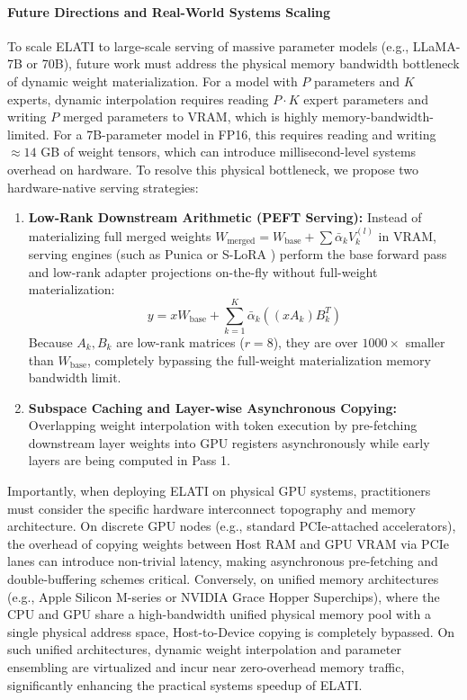 \paragraph{Future Directions and Real-World Systems Scaling}
To scale ELATI to large-scale serving of massive parameter models (e.g., LLaMA-7B or 70B), future work must address the physical memory bandwidth bottleneck of dynamic weight materialization.
For a model with $P$ parameters and $K$ experts, dynamic interpolation requires reading $P \cdot K$ expert parameters and writing $P$ merged parameters to VRAM, which is highly memory-bandwidth-limited. For a 7B-parameter model in FP16, this requires reading and writing $\approx 14$ GB of weight tensors, which can introduce millisecond-level systems overhead on hardware.
To resolve this physical bottleneck, we propose two hardware-native serving strategies:
\begin{enumerate}
    \item \textbf{Low-Rank Downstream Arithmetic (PEFT Serving):} Instead of materializing full merged weights $W_{\text{merged}} = W_{\text{base}} + \sum \bar{\alpha}_k V_k^{(l)}$ in VRAM, serving engines (such as Punica \cite{chen23punica} or S-LoRA \cite{sheng23slora}) perform the base forward pass and low-rank adapter projections on-the-fly without full-weight materialization:
    \begin{equation}
        y = x W_{\text{base}} + \sum_{k=1}^K \bar{\alpha}_k \left( (x A_k) B_k^T \right)
    \end{equation}
    Because $A_k, B_k$ are low-rank matrices ($r = 8$), they are over $1000\times$ smaller than $W_{\text{base}}$, completely bypassing the full-weight materialization memory bandwidth limit.
    \item \textbf{Subspace Caching and Layer-wise Asynchronous Copying:} Overlapping weight interpolation with token execution by pre-fetching downstream layer weights into GPU registers asynchronously while early layers are being computed in Pass 1.
\end{enumerate}

Importantly, when deploying ELATI on physical GPU systems, practitioners must consider the specific hardware interconnect topography and memory architecture. On discrete GPU nodes (e.g., standard PCIe-attached accelerators), the overhead of copying weights between Host RAM and GPU VRAM via PCIe lanes can introduce non-trivial latency, making asynchronous pre-fetching and double-buffering schemes critical. Conversely, on unified memory architectures (e.g., Apple Silicon M-series or NVIDIA Grace Hopper Superchips), where the CPU and GPU share a high-bandwidth unified physical memory pool with a single physical address space, Host-to-Device copying is completely bypassed. On such unified architectures, dynamic weight interpolation and parameter ensembling are virtualized and incur near zero-overhead memory traffic, significantly enhancing the practical systems speedup of ELATI.

